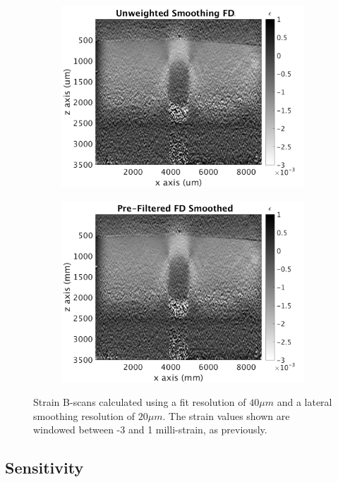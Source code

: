 \begin{figure}[bh!]
\begin{subfigure}{0.49\textwidth}
        \includegraphics[width=\textwidth]{figures/uwfd_fr40_lr20.png}
	\end{subfigure}
    \begin{subfigure}{0.49\textwidth}
    	\centering
        \includegraphics[width=\textwidth]{figures/fdsm_fr40_lr20.png}
    \end{subfigure}
    \label{bscan_images_2}
    \caption{Strain B-scans calculated using a fit resolution of $40\mu m$ and a lateral smoothing resolution of $20\mu m$. The strain values shown are windowed between -3 and 1 milli-strain, as previously.}
\end{figure}

\subsection{Sensitivity}

